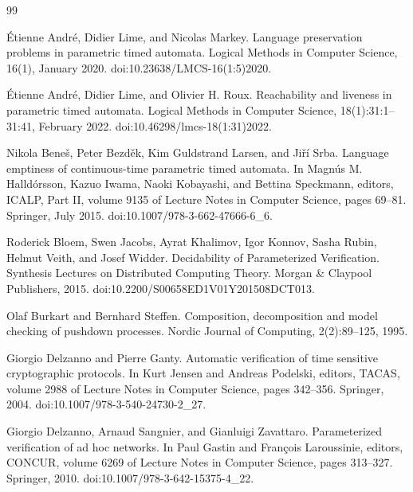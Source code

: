 \documentclass[10pt,a4paper]{article}
\begin{document}
\begin{thebibliography}{99}
\par\noindent    Étienne André, Didier Lime, and Nicolas Markey.  Language preservation problems in parametric timed automata.  Logical Methods in Computer Science, 16(1), January 2020.  doi:10.23638/LMCS-16(1:5)2020.  

\par\noindent    Étienne André, Didier Lime, and Olivier H. Roux.  Reachability and liveness in parametric timed automata.  Logical Methods in Computer Science, 18(1):31:1--31:41, February 2022.  doi:10.46298/lmcs-18(1:31)2022.  

\par\noindent    Nikola Beneš, Peter Bezděk, Kim Guldstrand Larsen, and Jiří Srba.  Language emptiness of continuous-time parametric timed automata.  In Magnús M. Halldórsson, Kazuo Iwama, Naoki Kobayashi, and Bettina Speckmann, editors, ICALP, Part II, volume 9135 of Lecture Notes in Computer Science, pages 69--81. Springer, July 2015.  doi:10.1007/978-3-662-47666-6\_6.  

\par\noindent    Roderick Bloem, Swen Jacobs, Ayrat Khalimov, Igor Konnov, Sasha Rubin, Helmut Veith, and Josef Widder.  Decidability of Parameterized Verification.  Synthesis Lectures on Distributed Computing Theory. Morgan \& Claypool Publishers, 2015.  doi:10.2200/S00658ED1V01Y201508DCT013.  

\par\noindent    Olaf Burkart and Bernhard Steffen.  Composition, decomposition and model checking of pushdown processes.  Nordic Journal of Computing, 2(2):89--125, 1995.  

\par\noindent    Giorgio Delzanno and Pierre Ganty.  Automatic verification of time sensitive cryptographic protocols.  In Kurt Jensen and Andreas Podelski, editors, TACAS, volume 2988 of Lecture Notes in Computer Science, pages 342--356. Springer, 2004.  doi:10.1007/978-3-540-24730-2\_27.  

\par\noindent    Giorgio Delzanno, Arnaud Sangnier, and Gianluigi Zavattaro.  Parameterized verification of ad hoc networks.  In Paul Gastin and François Laroussinie, editors, CONCUR, volume 6269 of Lecture Notes in Computer Science, pages 313--327. Springer, 2010.  doi:10.1007/978-3-642-15375-4\_22.  


\end{thebibliography}
\end{document}
